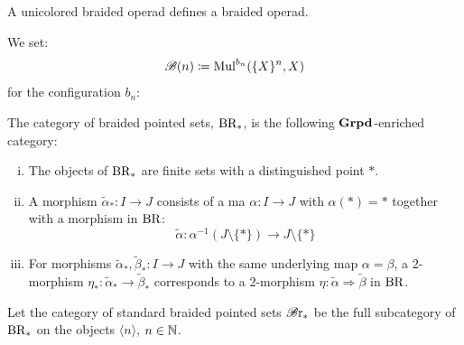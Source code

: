 \begin{frame}
    \begin{prop}
        A unicolored braided operad defines a braided operad.
    \end{prop}
        We set:
        \[
            \mathscr{B}(n) \coloneqq \operatorname{Mul}^{b_n}(\{X\}^n, X)
        \]
        for the configuration $b_n$:
\begin{center}
\end{center}
\end{frame}

\begin{frame}
\small{\begin{defin}
    The category of braided pointed sets, $\operatorname{BR_{\ast}}$, is the following
    $\operatorname{\textbf{Grpd}}$-enriched category:
    \begin{enumerate}[(i)]
        \item The objects of $\operatorname{BR_{\ast}}$ are finite sets with a distinguished point
        $\ast$.
        \item A morphism $\widetilde{\alpha}_{\ast} \colon I \to J$ consists of
        a ma $\alpha \colon I \to J$ with $\alpha(\ast)=\ast$ together with a
        morphism in $\operatorname{BR}$:
        \[
            \widetilde{\alpha} \colon \alpha^{-1}(J \setminus \{\ast\}) \to J \setminus \{\ast\}
        \]
        
        \item For morphisms $\widetilde{\alpha}_{\ast}, \widetilde{\beta}_{\ast}
        \colon I \to J$ with the same underlying map $\alpha = \beta$, a
        $2$-morphism $\eta_{\ast} \colon \widetilde{\alpha}_{\ast} \to
        \widetilde{\beta}_{\ast}$ corresponds to a $2$-morphism $\eta \colon
        \widetilde{\alpha} \Rightarrow \widetilde{\beta}$ in $\operatorname{BR}$.
    \end{enumerate}
\end{defin}

\begin{defin}
    Let the category of standard braided pointed sets $\mathscr{B} \text{r}_{\ast}$ be the full
    subcategory of $\operatorname{BR_{\ast}}$ on the objects $\langle n \rangle$, $n \in \mathbb{N}$.
    \end{defin}}
\end{frame}

